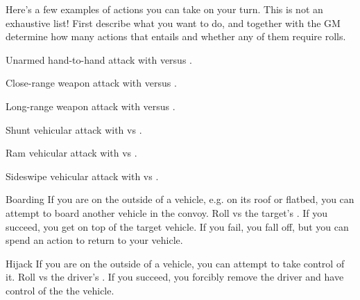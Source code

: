 
Here's a few examples of actions you can take on your turn. This is not an exhaustive list! First describe what you want to do, and together with the GM determine how many actions that entails and whether any of them require rolls.

\begin{describe}{Unarmed hand-to-hand}
  attack with  versus .
\end{describe}

\begin{describe}{Close-range weapon}
  attack with  versus .
\end{describe}

\begin{describe}{Long-range weapon}
  attack with  versus .
\end{describe}

\begin{describe}{Shunt}
  vehicular attack with  vs .
\end{describe}

\begin{describe}{Ram}
  vehicular attack with  vs .
\end{describe}

\begin{describe}{Sideswipe}
  vehicular attack with  vs .
\end{describe}

\hr

\begin{describe}{Boarding}
  If you are on the outside of a vehicle, e.g. on its roof or flatbed, you can attempt to board another vehicle in the convoy. Roll  vs the target's . If you succeed, you get on top of the target vehicle. If you fail, you fall off, but you can spend an action to return to your vehicle.
\end{describe}

\begin{describe}{Hijack}
  If you are on the outside of a vehicle, you can attempt to take control of it. Roll  vs the driver's . If you succeed, you forcibly remove the driver and have control of the the vehicle.
\end{describe}

